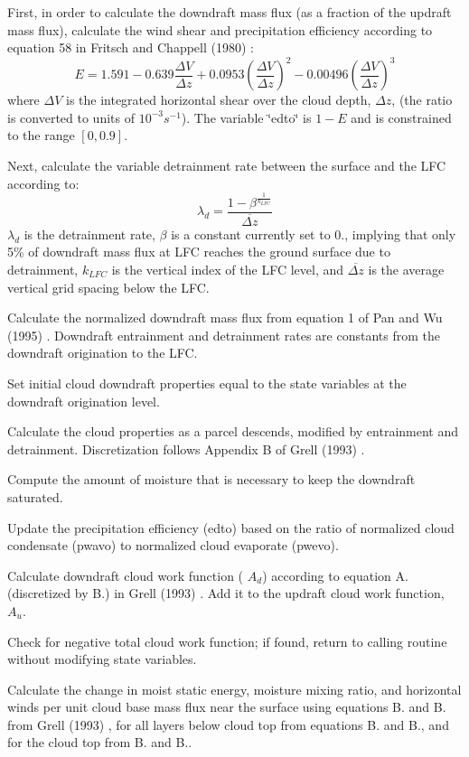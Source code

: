 \begin{DoxyItemize}
\item First, in order to calculate the downdraft mass flux (as a fraction of the updraft mass flux), calculate the wind shear and precipitation efficiency according to equation 58 in Fritsch and Chappell (1980) \cite{fritsch_and_chappell_1980} \+: \[ E = 1.591 - 0.639\frac{\Delta V}{\Delta z} + 0.0953\left(\frac{\Delta V}{\Delta z}\right)^2 - 0.00496\left(\frac{\Delta V}{\Delta z}\right)^3 \] where $\Delta V$ is the integrated horizontal shear over the cloud depth, $\Delta z$, (the ratio is converted to units of $10^{-3} s^{-1}$). The variable \char`\"{}edto\char`\"{} is $1-E$ and is constrained to the range $[0,0.9]$.
\item Next, calculate the variable detrainment rate between the surface and the L\+FC according to\+: \[ \lambda_d = \frac{1-\beta^{\frac{1}{k_{LFC}}}}{\overline{\Delta z}} \] $\lambda_d$ is the detrainment rate, $\beta$ is a constant currently set to 0., implying that only 5\% of downdraft mass flux at L\+FC reaches the ground surface due to detrainment, $k_{LFC}$ is the vertical index of the L\+FC level, and $\overline{\Delta z}$ is the average vertical grid spacing below the L\+FC.
\item Calculate the normalized downdraft mass flux from equation 1 of Pan and Wu (1995) \cite{pan_and_wu_1995} . Downdraft entrainment and detrainment rates are constants from the downdraft origination to the L\+FC.
\item Set initial cloud downdraft properties equal to the state variables at the downdraft origination level.
\item Calculate the cloud properties as a parcel descends, modified by entrainment and detrainment. Discretization follows Appendix B of Grell (1993) \cite{grell_1993} .
\item Compute the amount of moisture that is necessary to keep the downdraft saturated.
\item Update the precipitation efficiency (edto) based on the ratio of normalized cloud condensate (pwavo) to normalized cloud evaporate (pwevo).
\item Calculate downdraft cloud work function ( $A_d$) according to equation A. (discretized by B.) in Grell (1993) \cite{grell_1993} . Add it to the updraft cloud work function, $A_u$.
\item Check for negative total cloud work function; if found, return to calling routine without modifying state variables.
\item Calculate the change in moist static energy, moisture mixing ratio, and horizontal winds per unit cloud base mass flux near the surface using equations B. and B. from Grell (1993) \cite{grell_1993}, for all layers below cloud top from equations B. and B., and for the cloud top from B. and B..

\end{DoxyItemize}
